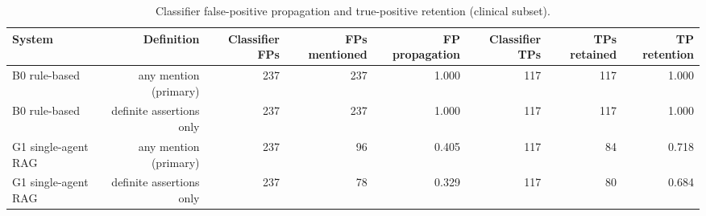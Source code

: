\begin{table}[t]
\centering
\scriptsize
\begin{tabular}{lrrrrrrr}
\hline
System & Definition & Classifier FPs & FPs mentioned & FP propagation & Classifier TPs & TPs retained & TP retention \\
\hline
B0 rule-based & any mention (primary) & 237 & 237 & 1.000 & 117 & 117 & 1.000 \\
B0 rule-based & definite assertions only & 237 & 237 & 1.000 & 117 & 117 & 1.000 \\
G1 single-agent RAG & any mention (primary) & 237 & 96 & 0.405 & 117 & 84 & 0.718 \\
G1 single-agent RAG & definite assertions only & 237 & 78 & 0.329 & 117 & 80 & 0.684 \\
\hline
\end{tabular}
\caption{Classifier false-positive propagation and true-positive retention (clinical subset).}
\label{tab:table5_false_positive_propagation}
\end{table}
